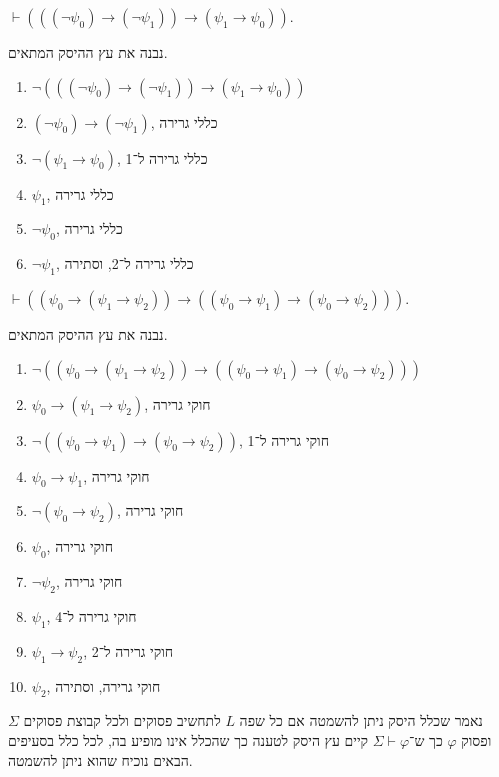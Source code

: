 \subquestion{}
$\vdash (((\lnot \psi_0) \to (\lnot \psi_1)) \to (\psi_1 \to \psi_0))$.
\begin{solution}
	נבנה את עץ ההיסק המתאים.
	\begin{enumerate}
		\item $\lnot (((\lnot \psi_0) \to (\lnot \psi_1)) \to (\psi_1 \to \psi_0))$
		\item $(\lnot \psi_0) \to (\lnot \psi_1)$, כללי גרירה
		\item $\lnot (\psi_1 \to \psi_0)$, כללי גרירה ל־1
		\item $\psi_1$, כללי גרירה
		\item $\lnot \psi_0$, כללי גרירה
		\item $\lnot \psi_1$, כללי גרירה ל־2, וסתירה
	\end{enumerate}
\end{solution}

\subquestion{}
$\vdash ((\psi_0 \to (\psi_1 \to \psi_2)) \to ((\psi_0 \to \psi_1) \to (\psi_0 \to \psi_2)))$.
\begin{solution}
	נבנה את עץ ההיסק המתאים.
	\begin{enumerate}
		\item $\lnot ((\psi_0 \to (\psi_1 \to \psi_2)) \to ((\psi_0 \to \psi_1) \to (\psi_0 \to \psi_2)))$
		\item $\psi_0 \to (\psi_1 \to \psi_2)$, חוקי גרירה
		\item $\lnot ((\psi_0 \to \psi_1) \to (\psi_0 \to \psi_2))$, חוקי גרירה ל־1
		\item $\psi_0 \to \psi_1$, חוקי גרירה
		\item $\lnot (\psi_0 \to \psi_2)$, חוקי גרירה
		\item $\psi_0$, חוקי גרירה
		\item $\lnot \psi_2$, חוקי גרירה
		\item $\psi_1$, חוקי גרירה ל־4
		\item $\psi_1 \to \psi_2$, חוקי גרירה ל־2
		\item $\psi_2$, חוקי גרירה, וסתירה
	\end{enumerate}
\end{solution}

\question{}
נאמר שכלל היסק ניתן להשמטה אם כל שפה $L$ לתחשיב פסוקים ולכל קבוצת פסוקים $\Sigma$ ופסוק $\varphi$ כך ש־$\Sigma \vdash \varphi$ קיים עץ היסק לטענה כך שהכלל אינו מופיע בה, לכל כלל בסעיפים הבאים נוכיח שהוא ניתן להשמטה.

